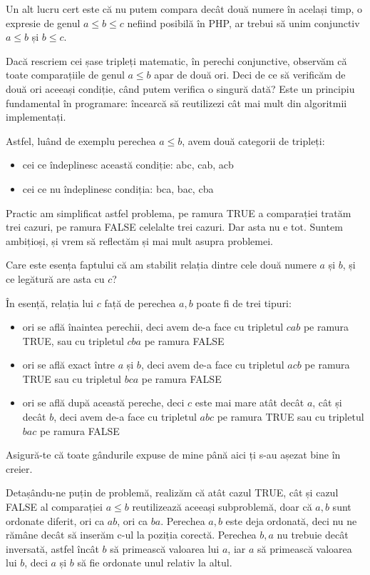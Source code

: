 Un alt lucru cert este că nu putem compara decât două numere în același timp, o expresie
de genul  $a \leq b \leq c$ nefiind posibilă în PHP, ar trebui să unim conjunctiv
 $a \leq b $ și $b \leq c$.

Dacă rescriem cei șase tripleți matematic, în perechi conjunctive, observăm că toate
comparațiile de genul $a \leq b$ apar de două ori. Deci de ce să verificăm de două
ori aceeași condiție, când putem verifica o singură dată? Este un principiu fundamental
în programare: încearcă să reutilizezi cât mai mult din algoritmii implementați.

Astfel, luând de exemplu perechea $a \leq b$, avem două categorii de tripleți:
\begin{itemize}
\item cei ce îndeplinesc această condiție: abc, cab, acb
\item cei ce nu îndeplinesc condiția: bca, bac, cba
\end{itemize}

Practic am simplificat astfel problema, pe ramura TRUE
a comparației tratăm trei cazuri, pe ramura FALSE celelalte
trei cazuri. Dar asta nu e tot. Suntem ambițioși, și vrem să
reflectăm și mai mult asupra problemei.

Care este esența faptului că am stabilit relația dintre cele două
numere $a$ și $b$, și ce legătură are asta cu $c$?

În esență, relația lui $c$ față de perechea $a,b$ poate fi de trei tipuri:
\begin{itemize}
\item ori se află înaintea perechii, deci avem de-a face cu tripletul $cab$ pe ramura TRUE,
sau cu tripletul $cba$ pe ramura FALSE
\item ori se află exact între $a$ și $b$, deci avem de-a face cu tripletul $acb$ pe ramura TRUE sau
cu tripletul $bca$ pe ramura FALSE
\item ori se află după această pereche, deci $c$ este mai mare atât decât $a$, cât și
decât $b$, deci avem de-a face cu tripletul $abc$ pe ramura TRUE sau cu tripletul
$bac$ pe ramura FALSE
\end{itemize}

Asigură-te că toate gândurile expuse de mine până aici ți s-au așezat bine în creier.

Detașându-ne puțin de problemă, realizăm că atât cazul TRUE, cât și cazul FALSE al comparației
$a \leq b$ reutilizează aceeași subproblemă, doar că $a,b$ sunt ordonate diferit, ori ca $ab$, ori ca
$ba$. Perechea $a,b$ este deja ordonată, deci nu ne rămâne decât să inserăm c-ul la poziția corectă.
Perechea $b,a$ nu trebuie decât inversată, astfel încât $b$ să primească valoarea lui $a$, iar $a$ să
primească valoarea lui $b$, deci $a$ și $b$ să fie ordonate unul relativ la altul.


